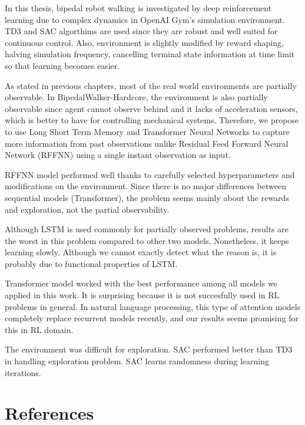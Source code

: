 \documentclass[a4paper, 12pt]{article} %
\begin{document}
In this thesis, bipedal robot walking is investigated by deep  reinforcement learning due to complex dynamics in OpenAI Gym's simulation environment. 
TD3 and SAC algorthims are used since they are robust and well suited for continuous control. 
Also, environment is slightly modified by reward shaping, halving simulation frequency, cancelling terminal state information at time limit so that learning becomes easier.

As stated in previous chapters, most of the real world environments are partially observable. 
In BipedalWalker-Hardcore, the environment is also partially observable since agent cannot observe behind and it lacks of acceleration sensors, which is better to have for controlling mechanical systems. 
Therefore, we propose to use Long Short Term Memory and Transformer Neural Networks to capture more information from past observations unlike Residual Feed Forward Neural Network (RFFNN) using a single instant observation as input. 

RFFNN model performed well thanks to carefully selected hyperparameters and modifications on the environment. 
Since there is no major differences between sequential models (Transformer), the problem seems mainly about the rewards and exploration, not the partial observability. 

Although LSTM is used commonly for partially observed problems, results are the worst in this problem compared to other two models. Nonetheless, it keeps learning slowly. 
Although we cannot exactly detect what the reason is, it is probably due to functional properties of LSTM. 

Transformer model worked with the best performance among all models we applied in this work. 
It is surprising because it is not succesfully used in RL problems in general. 
In natural language processing, this type of attention models completely replace recurrent models recently, and our results seems promising for this in RL domain. 

The environment was difficult for exploration. SAC performed better than TD3 in handling exploration problem. SAC learns randomness during learning iterations.  

\section{References}

\end{document}
